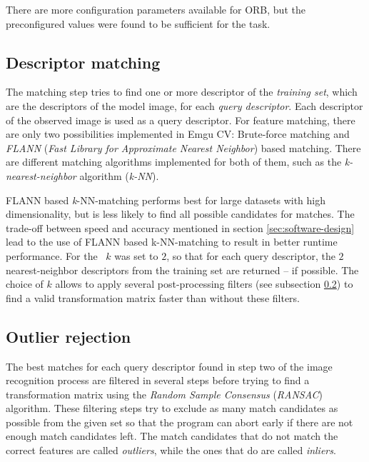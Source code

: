 There are more configuration parameters available for ORB, but the preconfigured values were found to be sufficient for the task.

\subsection{Descriptor matching}\label{sec:tech-bg:subsec:descriptor-matching}

The matching step tries to find one or more descriptor of the \emph{training set}, which are the descriptors of the model image, for each \emph{query descriptor}. Each descriptor of the observed image is used as a query descriptor. For feature matching, there are only two possibilities implemented in Emgu CV: Brute-force matching and \emph{FLANN} (\emph{Fast Library for Approximate Nearest Neighbor}) \cite{flann} based matching. There are different matching algorithms implemented for both of them, such as the \emph{k-nearest-neighbor} algorithm (\emph{k-NN}).

FLANN based \emph{k}-NN-matching performs best for large datasets with high dimensionality, but is less likely to find all possible candidates for matches. \cite{flann} The trade-off between speed and accuracy mentioned in section \ref{sec:software-design} lead to the use of FLANN based k-NN-matching to result in better runtime performance. For the \vd~$k$ was set to $2$, so that for each query descriptor, the $2$ nearest-neighbor descriptors from the training set are returned -- if possible. The choice of $k$ allows to apply several post-processing filters (see subsection \ref{sec:tech-bg:subsec:outlier-rejection}) to find a valid transformation matrix faster than without these filters.

\subsection{Outlier rejection}\label{sec:tech-bg:subsec:outlier-rejection}

The best matches for each query descriptor found in step two of the image recognition process are filtered in several steps before trying to find a transformation matrix using the \emph{Random Sample Consensus} (\emph{RANSAC}) \cite{ransac} algorithm. These filtering steps try to exclude as many match candidates as possible from the given set so that the program can abort early if there are not enough match candidates left. The match candidates that do not match the correct features are called \emph{outliers}, while the ones that do are called \emph{inliers}.

